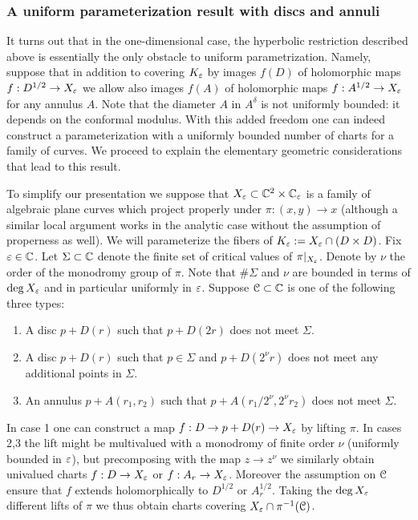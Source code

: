 \documentclass[reqno]{amsart}
\renewcommand\~[1]{\widetilde{#1}}
\def\rest#1{{\vert_{#1}}} \def\onL{\rest{\cL}}
\begin{document}
\subsubsection{A uniform parameterization result with discs and annuli}

It turns out that in the one-dimensional case, the hyperbolic
restriction described above is essentially the only obstacle to
uniform parametrization. Namely, suppose that in addition to covering
$K_\varepsilon$ by images $f(D)$ of holomorphic maps $f:D^{1/2}\to X_\varepsilon$ we
allow also images $f(A)$ of holomorphic maps $f:A^{1/2}\to X_\varepsilon$ for
any annulus $A$. Note that the diameter $A$ in $A^\delta$ is not
uniformly bounded: it depends on the conformal modulus. With this
added freedom one can indeed construct a parameterization with a
uniformly bounded number of charts for a family of curves. We proceed
to explain the elementary geometric considerations that lead to this
result.

To simplify our presentation we suppose that
$X_\varepsilon\subset{\mathbb C}^2\times{\mathbb C}_\varepsilon$ is a family of algebraic plane curves
which project properly under $\pi:(x,y)\to x$ (although a similar local
argument works in the analytic case without the assumption of
properness as well). We will parameterize the fibers of
$K_\varepsilon:=X_\varepsilon\cap(D\times D)$. Fix $\varepsilon\in{\mathbb C}$. Let $\Sigma\subset{\mathbb C}$
denote the finite set of critical values of $\pi\rest{X_\e}$. Denote by $\nu$ the
order of the monodromy group of $\pi$. Note that $\#\Sigma$ and $\nu$
are bounded in terms of $\deg X_\varepsilon$ and in particular uniformly in
$\varepsilon$. Suppose ${\mathcal C}\subset{\mathbb C}$ is one of the following three types:
\begin{enumerate}
\item A disc $p+D(r)$ such that $p+D(2r)$ does not meet $\Sigma$.
\item A disc $p+D(r)$ such that $p\in\Sigma$ and $p+D(2^\nu r)$ does
  not meet any additional points in $\Sigma$.
\item An annulus $p+A(r_1,r_2)$ such that $p+A(r_1/2^\nu,2^\nu r_2)$ does not
  meet $\Sigma$.
\end{enumerate}
In case 1 one can construct a map $f:D\to p+D(r)\to X_\varepsilon$ by lifting
$\pi$. In cases 2,3 the lift might be multivalued with a monodromy of
finite order $\nu$ (uniformly bounded in $\varepsilon$), but precomposing with
the map $z\to z^\nu$ we similarly obtain univalued charts
$f:D\to X_\varepsilon$ or $f:A_r\to X_\varepsilon$. Moreover the assumption on ${\mathcal C}$
ensure that $f$ extends holomorphically to $D^{1/2}$ or
$A_r^{1/2}$. Taking the $\deg X_\varepsilon$ different lifts of $\pi$ we thus
obtain charts covering $X_\varepsilon\cap\pi^{-1}({\mathcal C})$.
\end{document}
